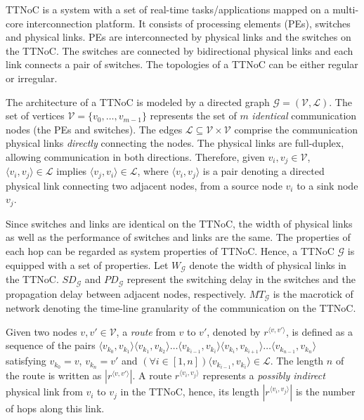 \documentclass[journal]{IEEEtran}
\newcommand{\calG}{\mathcal{G}}
\newcommand{\calV}{\mathcal{V}}
\newcommand{\calL}{\mathcal{L}}
\newcommand{\width}{\mathit{W}_\calG}
\newcommand{\SD}{\mathit{SD}_\calG}
\newcommand{\HD}{\mathit{PD}_\calG}
\newcommand{\MT}{\mathit{MT}_\calG}
\newcommand{\route}[3]{#1^{\langle #2,#3\rangle}}
\theoremstyle{remark}
\begin{document}
TTNoC is a system with a set of real-time tasks/applications mapped on a multi-core interconnection platform. 
It consists of processing elements (PEs), switches and physical links.
PEs are interconnected by physical links and the switches on the TTNoC.
The switches are connected by bidirectional physical links and each link connects a pair of switches.  
The topologies of a TTNoC can be either regular or irregular.

The architecture of a TTNoC is modeled by a directed graph $\calG=(\calV,\calL)$. 
The set of vertices $\mathcal{V}=\{ v_{0},\dots,v_{m-1}\}$ represents the set of $m$ \emph{identical} communication nodes (the PEs and switches).
The edges $\mathcal{L}\subseteq \mathcal{V} \times\mathcal{V}$ comprise the communication physical links \emph{directly} connecting the nodes.
The physical links are full-duplex, allowing communication in both directions. 
Therefore, given $v_i,v_j\in\calV$, $\langle v_i,v_j\rangle \in\calL$ implies $\langle v_j,v_i\rangle\in\calL$,
 where $\langle v_i,v_j\rangle$ is a pair denoting a directed physical link connecting two adjacent nodes,
  from a source node $v_i$ to a sink node $v_j$.

Since switches and links are identical on the TTNoC,
 the width of physical links as well as the performance of switches and links are the same.
The properties of each hop can be regarded as system properties of TTNoC.
Hence, a TTNoC $\calG$ is equipped with a set of properties. 
Let $\width$ denote the width of physical links in the TTNoC.
$\SD$ and $\HD$ represent the switching delay in the switches and the propagation delay between adjacent nodes, respectively.
$\MT$ is the macrotick of network denoting the time-line granularity of the communication on the TTNoC.


Given two nodes $v,v'\in\calV$, a \emph{route} from $v$ to $v'$,
 denoted by $\route{r}{v}{v'}$, is defined as a sequence of the pairs 
 $\langle v_{k_0},v_{k_1}\rangle\langle
v_{k_1},v_{k_2}\rangle\ldots\langle v_{k_{i-1}},v_{k_i}\rangle\langle
v_{k_i},v_{k_{i+1}}\rangle\ldots \langle v_{k_{n-1}},v_{k_n}\rangle$
satisfying $v_{k_0}=v$, $v_{k_n}=v'$ and $(\forall i\in [1,n])\langle
v_{k_{i-1}},v_{k_i}\rangle \in\calL$. The length $n$ of the route is
written as $|\route{r}{v}{v'}|$. A route $\route{r}{v_i}{v_j}$
represents a \emph{possibly indirect} physical link from $v_i$ to
$v_j$ in the TTNoC, hence, its length $|\route{r}{v_i}{v_j}|$ is the
number of hops along this link.
\end{document}
